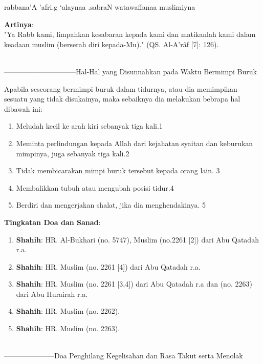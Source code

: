 \documentclass[a4paper,12pt]{article}
\begin{document}
\begin{arabtext}
\noindent
rabbana'A 'afri.g `alaynaa .sabraN watawaffanaa muslimiyna
\end{arabtext}
\noindent
\textbf{Artinya}:\\
\indent
"Ya Rabb kami, limpahkan kesabaran kepada kami dan matikanlah kami dalam 
keadaan muslim (berserah diri kepada-Mu)." (QS. Al-A'r\^{a}f [7]: 126).\\\\
\par
{}------------------------------Hal-Hal yang Disunnahkan pada Waktu Bermimpi Buruk
\par
\indent
Apabila seseorang bermimpi buruk dalam tidurnya, atau dia memimpikan 
sesuatu yang tidak disukainya, maka sebaiknya dia melakukan bebrapa hal 
dibawah ini:
\begin{enumerate}
\item Meludah kecil ke arah kiri sebanyak tiga kali.{\scriptsize 1}
\item Meminta perlindungan kepada Allah dari kejahatan syaitan dan
keburukan mimpinya, juga sebanyak tiga kali.{\scriptsize 2}
\item Tidak membicarakan mimpi buruk tersebut kepada orang lain.
{\scriptsize 3}
\item Membalikkan tubuh atau mengubah posisi tidur.{\scriptsize 4}
\item Berdiri dan mengerjakan shalat, jika dia menghendakinya.
{\scriptsize 5}\\
\end{enumerate}
\par
\noindent
\textbf{Tingkatan Doa dan Sanad}: 
\begin{enumerate}
\item \textbf{Shahih}: HR. Al-Bukhari (no. 5747), Muslim (no.2261 [2]) dari
Abu Qatadah r.a.
\item \textbf{Shahih}: HR. Muslim (no. 2261 [4]) dari Abu Qatadah r.a.
\item \textbf{Shahih}: HR. Muslim (no. 2261 [3,4]) dari Abu Qatadah r.a dan
(no. 2263) dari Abu Hurairah r.a.
\item \textbf{Shahih}: HR. Muslim (no. 2262).
\item \textbf{Shahih}: HR. Muslim (no. 2263).\\\\
\end{enumerate}
\par
{}---------------------Doa Penghilang Kegelisahan dan Rasa Takut serta Menolak
\end{document}

